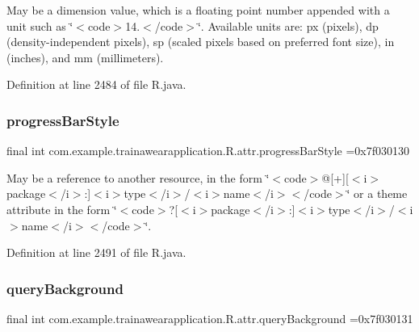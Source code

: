 May be a dimension value, which is a floating point number appended with a unit such as \char`\"{}$<$code$>$14.\+5sp$<$/code$>$\char`\"{}. Available units are\+: px (pixels), dp (density-\/independent pixels), sp (scaled pixels based on preferred font size), in (inches), and mm (millimeters). 

Definition at line 2484 of file R.\+java.

\mbox{\label{classcom_1_1example_1_1trainawearapplication_1_1_r_1_1attr_a7f579cbe7f76759b6d547b8ffa043ab5}} 
\subsubsection{\texorpdfstring{progressBarStyle}{progressBarStyle}}
{\footnotesize\ttfamily final int com.\+example.\+trainawearapplication.\+R.\+attr.\+progress\+Bar\+Style =0x7f030130\hspace{0.3cm}{\ttfamily [static]}}

May be a reference to another resource, in the form \char`\"{}$<$code$>$@\mbox{[}+\mbox{]}\mbox{[}$<$i$>$package$<$/i$>$\+:\mbox{]}$<$i$>$type$<$/i$>$/$<$i$>$name$<$/i$>$$<$/code$>$\char`\"{} or a theme attribute in the form \char`\"{}$<$code$>$?\mbox{[}$<$i$>$package$<$/i$>$\+:\mbox{]}$<$i$>$type$<$/i$>$/$<$i$>$name$<$/i$>$$<$/code$>$\char`\"{}. 

Definition at line 2491 of file R.\+java.

\mbox{\label{classcom_1_1example_1_1trainawearapplication_1_1_r_1_1attr_abb6a1dbf6a0c61447239d8af260dd73f}} 
\subsubsection{\texorpdfstring{queryBackground}{queryBackground}}
{\footnotesize\ttfamily final int com.\+example.\+trainawearapplication.\+R.\+attr.\+query\+Background =0x7f030131\hspace{0.3cm}{\ttfamily [static]}}

